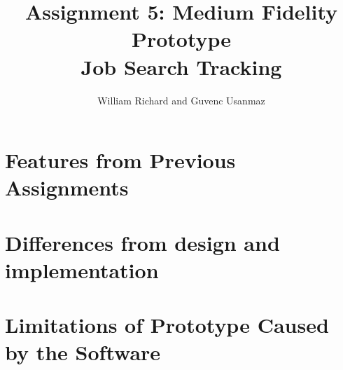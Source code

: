 \documentclass[12pt, letter]{article}
\title{Assignment 5: Medium Fidelity Prototype \\ Job Search Tracking}
\author{William Richard and Guvenc Usanmaz}
\begin{document}
\maketitle

\section{Features from Previous Assignments}

\section{Differences from design and implementation}

\section{Limitations of Prototype Caused by the Software}
\end{document}
